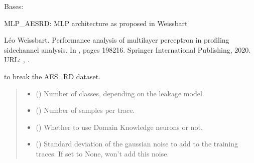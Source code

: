 \documentclass[letterpaper,10pt,english]{sphinxmanual}
\begin{document}
\begin{fulllineitems}
\label{\detokenize{MLSCAlib.Architectures:MLSCAlib.Architectures.torch_models.MLP_AESRD}}
\pysigstartsignatures
{}
\pysigstopsignatures
\sphinxAtStartPar
Bases: 

\sphinxAtStartPar
MLP\_AESRD: MLP architecture as proposed in Weissbart%
\begin{footnote}[7]\sphinxAtStartFootnote
Léo Weissbart. Performance analysis of multilayer perceptron in profiling side\sphinxhyphen{}channel analysis. In , pages 198\textendash{}216. Springer International Publishing, 2020. URL: , .
%
\end{footnote} to break the AES\_RD dataset.
\begin{quote}\begin{description}
\begin{itemize}
\item {} 
\sphinxAtStartPar
{} () \textendash{} Number of classes, depending on the leakage model.

\item {} 
\sphinxAtStartPar
{} () \textendash{} Number of samples per trace.

\item {} 
\sphinxAtStartPar
{} (\sphinxstyleliteralemphasis{\sphinxupquote{, }}) \textendash{} Whether to use Domain Knowledge neurons or not.

\item {} 
\sphinxAtStartPar
{} (\sphinxstyleliteralemphasis{\sphinxupquote{, }}) \textendash{} Standard deviation of the gaussian noise to add to the training traces. If set
to None, won’t add this noise.


\end{itemize}
\end{description}
\end{quote}
\end{fulllineitems}
\end{document}
